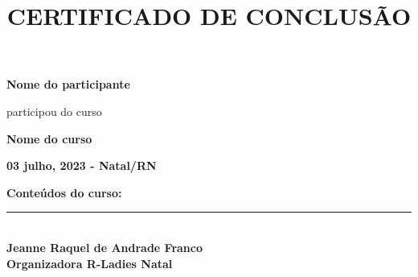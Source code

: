 \documentclass[14pt,a4paper]{extarticle}
\title{CERTIFICADO DE CONCLUSÃO}
\author{}
\date{}
\providecommand{\opensans}{\normalfont}
\begin{document}
\opensans

\maketitle

\begin{center}

\Large \textbf{
Nome do participante
}

\vspace{1.3cm}

\normalsize
participou do curso 

\vspace{0.8cm}

\Large \textbf{
Nome do curso 
}
\normalsize

\large \textbf{
03 julho, 2023 - Natal/RN
}

\vspace{0.5cm}

\Large \textbf{
Conteúdos do curso:
}

\vspace{0.5cm}

\normalsize
\begin{varwidth}{0.8\textwidth}


\end{varwidth}

\vfill




\rule[0in]{3in}{1pt}\\
\textbf{Jeanne Raquel de Andrade Franco\\
        Organizadora R-Ladies Natal}\\
\vspace{0.8cm}

\end{center}
\end{document}
